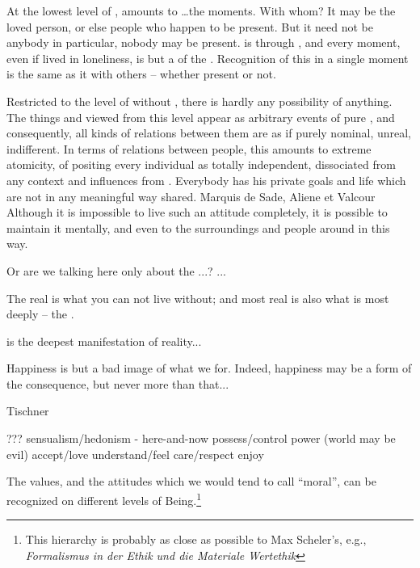 {\pa\imm
At the lowest level of ,  
amounts to  \ldots the moments. 
With whom? It may be the loved person, or else people who happen to be 
present. But it need not be anybody in particular, nobody may be 
 present. 
 is  through , and 
every moment, even if lived in loneliness, is but a  of the 
. Recognition of this  in a single moment 
is the same as  it with others -- whether  
present or not. 

\pa %
Restricted to the level of  without
, there is hardly any possibility of 
anything.  The things and  viewed from this level appear as
arbitrary events of pure , and consequently, all kinds
of relations between them are as if purely nominal, unreal,
indifferent.  In terms of relations between people, this amounts to
extreme atomicity, of positing every individual as totally
independent, dissociated from any context and influences from
.  Everybody has his private goals and life which are not
in any meaningful way shared.   {Marquis de Sade, Aliene et Valcour}
Although it is impossible to live such an attitude completely, it is possible to
maintain it mentally, and even to  the surroundings and people
around in this way.


Or are we talking here only about the ...? ...

The real is what you can not live without; and most real is also what
is most deeply  -- the . 

 is the deepest manifestation of reality...

Happiness is but a bad image of what we  for. Indeed, happiness may
be a form of the consequence, but never more than that...

Tischner

??? 
    {sensualism/hedonism - here-and-now}
    {possess/control}
    {power (world may be evil)}
 {accept/love}
    {understand/feel}
    {care/respect}
    {enjoy}

\pa
 The values, and the attitudes which 
we would tend to call ``moral'', can be recognized on different 
levels of Being.\footnote{This hierarchy is probably as close as 
possible to Max Scheler's, e.g., {\em Formalismus in der Ethik und 
die Materiale Wertethik}}

}
